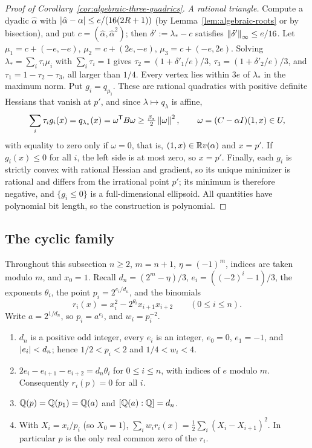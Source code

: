 \begin{proof}[Proof of Corollary~\ref{cor:algebraic-three-quadrics}]
\emph{A rational triangle.} Compute a dyadic $\hat\alpha$ with
$\left\lvert\hat\alpha-\alpha\right\rvert\le e/(16(2R+1))$ (by Lemma~\ref{lem:algebraic-roots}
or by bisection), and put $c=(\hat\alpha,\hat\alpha^2)$; then
$\delta':=\lambda_*-c$ satisfies $\left\lVert\delta'\right\rVert_\infty\le e/16$. Let
$\mu_1=c+(-e,-e)$, $\mu_2=c+(2e,-e)$, $\mu_3=c+(-e,2e)$. Solving
$\lambda_*=\sum_i\tau_i\mu_i$ with $\sum_i\tau_i=1$ gives
$\tau_2=(1+\delta'_1/e)/3$, $\tau_3=(1+\delta'_2/e)/3$, and
$\tau_1=1-\tau_2-\tau_3$, all larger than $1/4$. Every vertex lies within $3e$
of $\lambda_*$ in the maximum norm. Put $g_i=q_{\mu_i}$. These are rational
quadratics with positive definite Hessians that vanish at $p'$, and since
$\lambda\mapsto q_\lambda$ is affine,
\[
 \sum_i\tau_ig_i(x)=q_{\lambda_*}(x)=\omega^{\mathsf T}B\omega
 \ge\tfrac{\beta_*}2\left\lVert\omega\right\rVert^2,\qquad \omega=(C-\alpha I)(1,x)\in U,
\]
with equality to zero only if $\omega=0$, that is, $(1,x)\in\mathbb R v(\alpha)$ and
$x=p'$. If
$g_i(x)\le0$ for all $i$, the left side is at most zero, so $x=p'$. Finally,
each $g_i$ is strictly convex with rational Hessian and gradient, so its
unique minimizer is rational and differs from the irrational point $p'$; its
minimum is therefore negative, and $\{g_i\le0\}$ is a full-dimensional
ellipsoid. All quantities have polynomial bit length, so the construction is
polynomial.
\end{proof}

\subsection{The cyclic family}
\label{app:algebraic-cyclic}

Throughout this subsection $n\ge2$, $m=n+1$, $\eta=(-1)^m$, indices are taken
modulo $m$, and $x_0=1$. Recall $d_n=(2^m-\eta)/3$, $e_i=((-2)^i-1)/3$, the
exponents $\theta_i$, the point $p_i=2^{e_i/d_n}$, and the binomials
\[
 r_i(x)=x_i^2-2^{\theta_i}x_{i+1}x_{i+2}\qquad(0\le i\le n).
\]
Write $a=2^{1/d_n}$, so $p_i=a^{e_i}$, and $w_i=p_i^{-2}$.

\begin{lemma}
\label{lem:algebraic-cyclic-point}
\begin{enumerate}[label=(\alph*)]
\item $d_n$ is a positive odd integer, every $e_i$ is an integer, $e_0=0$,
  $e_1=-1$, and $\left\lvert e_i\right\rvert<d_n$; hence $1/2<p_i<2$ and $1/4<w_i<4$.
\item $2e_i-e_{i+1}-e_{i+2}=d_n\theta_i$ for $0\le i\le n$, with indices of
  $e$ modulo $m$. Consequently $r_i(p)=0$ for all $i$.
\item $\mathbb Q(p)=\mathbb Q(p_1)=\mathbb Q(a)$ and $[\mathbb Q(a):\mathbb Q]=d_n$.
\item With $X_i=x_i/p_i$ (so $X_0=1$),
  $\sum_iw_ir_i(x)=\tfrac12\sum_i(X_i-X_{i+1})^2$. In particular $p$ is the
  only real common zero of the $r_i$.
\end{enumerate}
\end{lemma}

